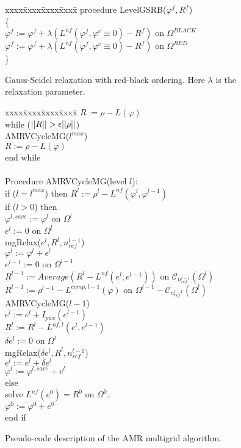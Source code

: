 \begin{figure}[thp]
\hrulefill
\begin{tabbing} 
xxxx\=xxxx\=xxxx\=xxxx\=\kill
procedure LevelGSRB($\varphi^f, R^f$) \\
\{ \\
\>$ \varphi^f := \varphi^f +
 \lambda(L^{nf} (\varphi^f, \varphi^c \equiv0) - R^f)
\mbox{ on } \Omega^{BLACK}$ \\
\>$ \varphi^f := \varphi^f +
 \lambda(L^{nf} (\varphi^f, \varphi^c \equiv 0) - R^f)
\mbox{ on } \Omega^{RED}$ \\
\}
\end{tabbing}
\caption{Gauss-Seidel relaxation with red-black ordering.
Here $\lambda$ is the relaxation parameter.}
\label{LevelGSRB}
\hrulefill
\end{figure}

\begin{figure}[thp]
\hrulefill
\begin{tabbing} 
xxxx\=xxxx\=xxxx\=xxxx\=\kill
\>$R:= \rho - L(\varphi)$ \\
\>while ($||R|| > \epsilon||\rho||$)\\
\>\>AMRVCycleMG($l^{max}$) \\
\>\>$R:= \rho - L(\varphi)$\\
\>end while\\
\\
\> Procedure AMRVCycleMG(level $l$):
\\
\>if ($l = l^{max}$) then $R^l:= \rho^l - L^{nf}(\varphi^l,\varphi^{l-1})$ \\
\>if ($l > 0 $) then \\
\>\>$\varphi^{l,save} := \varphi^l$ on $\Omega^l$ \\
\>\>$e^{l} :=0$ on $\Omega^l$ \\
\>\>mgRelax($e^l, R^l, n_{ref}^{l-1}$) \\
\>\>$\varphi^l := \varphi^l + e^l$ \\
\>\>$e^{l-1} :=0$ on $\Omega^{l-1}$ \\
\>\>$R^{l-1}:= Average(R^{l} - L^{nf}(e^l,e^{l-1}))$  on
$\mathcal{C}_{n_{ref}^{l-1}}(\Omega^l)$ \\
\>\>$R^{l-1}:= \rho^{l-1} - L^{comp,l-1}(\varphi)$  on
$\Omega^{l-1}-\mathcal{C}_{n_{ref}^{l-1}}(\Omega^l)$ \\
\>\>AMRVCycleMG($l-1$) \\
\>\>$e^l := e^l + I_{pwc}(e^{l-1})$ \\
\>\>$R^l := R^l - L^{nf,l}(e^l, e^{l-1})$ \\
\>\> $\delta e^l := 0$ on $\Omega^l$ \\
\>\>mgRelax($\delta e^l, R^l, n_{ref}^{l-1}$) \\
\>\>$e^l := e^l + \delta e^l$ \\
\>\>$\varphi^l := \varphi^{l,save} + e^l$ \\
\>else \\        
\>\> solve $L^{nf} (e^0) = R^0$ on $\Omega^0$. \\
\>\>$\varphi^0 := \varphi^0 + e^0$ \\
\>end if
\end{tabbing}
\caption{Pseudo-code description of the AMR multigrid algorithm.}
\label{MGSUMMARY}
\hrulefill
\end{figure}

